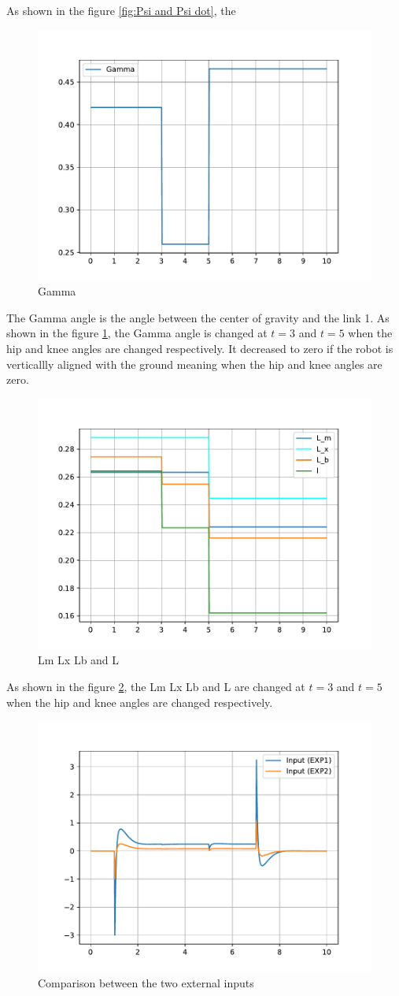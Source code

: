 As shown in the figure \ref{fig:Psi and Psi dot}, the %


\begin{figure}[h]
	\centering
	\includegraphics[width=.5\textwidth]{Gamma}
	\caption{Gamma}
	\label{fig:Gamma}
\end{figure}

The Gamma angle is the angle between the center of gravity and the link 1. As shown in the figure \ref{fig:Gamma}, the Gamma angle is changed at $t=3$ and $t=5$ when the hip and knee angles are changed respectively. It decreased to zero if the robot is verticallly aligned with the ground meaning when the hip and knee angles are zero.

\begin{figure}[h]
	\centering
	\includegraphics[width=.5\textwidth]{L_m L_x L_b L}
	\caption{Lm Lx Lb and L}
	\label{fig:Lm Lx Lb and L}
\end{figure}

As shown in the figure \ref{fig:Lm Lx Lb and L}, the Lm Lx Lb and L are changed at $t=3$ and $t=5$ when the hip and knee angles are changed respectively.
\begin{figure}[h]
	\centering
	\includegraphics[width=.5\textwidth]{Comparison between the two external inputs}
	\caption{Comparison between the two external inputs}
	\label{fig:Comparison between the two external inputs}
\end{figure}

